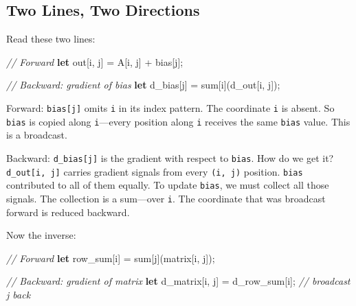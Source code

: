 \documentclass[11pt,titlepage]{article}
\newenvironment{Shaded}{}{}
\newcommand{\CommentTok}[1]{\textcolor[rgb]{0.38,0.63,0.69}{\textit{#1}}}
\newcommand{\KeywordTok}[1]{\textcolor[rgb]{0.00,0.44,0.13}{\textbf{#1}}}
\newcommand{\NormalTok}[1]{#1}
\newcommand{\OperatorTok}[1]{\textcolor[rgb]{0.40,0.40,0.40}{#1}}
\begin{document}
\vspace{2em}

\hypertarget{two-lines-two-directions}{%
\subsection{Two Lines, Two Directions}\label{two-lines-two-directions}}

Read these two lines:

\begin{Shaded}
\begin{Highlighting}[]
\CommentTok{// Forward}
\KeywordTok{let}\NormalTok{ out}\OperatorTok{[}\NormalTok{i, j}\OperatorTok{]}\NormalTok{ = A}\OperatorTok{[}\NormalTok{i, j}\OperatorTok{]}\NormalTok{ + bias}\OperatorTok{[}\NormalTok{j}\OperatorTok{]}\NormalTok{;}

\CommentTok{// Backward: gradient of bias}
\KeywordTok{let}\NormalTok{ d_bias}\OperatorTok{[}\NormalTok{j}\OperatorTok{]}\NormalTok{ = sum}\OperatorTok{[}\NormalTok{i}\OperatorTok{]}\NormalTok{(d_out}\OperatorTok{[}\NormalTok{i, j}\OperatorTok{]}\NormalTok{);}
\end{Highlighting}
\end{Shaded}

Forward: \texttt{bias{[}j{]}} omits \texttt{i} in its index pattern. The
coordinate \texttt{i} is absent. So \texttt{bias} is copied along
\texttt{i}---every position along \texttt{i} receives the same
\texttt{bias} value. This is a broadcast.

Backward: \texttt{d\_bias{[}j{]}} is the gradient with respect to
\texttt{bias}. How do we get it? \texttt{d\_out{[}i,\ j{]}} carries
gradient signals from every \texttt{(i,\ j)} position. \texttt{bias}
contributed to all of them equally. To update \texttt{bias}, we must
collect all those signals. The collection is a sum---over \texttt{i}.
The coordinate that was broadcast forward is reduced backward.

Now the inverse:

\begin{Shaded}
\begin{Highlighting}[]
\CommentTok{// Forward}
\KeywordTok{let}\NormalTok{ row_sum}\OperatorTok{[}\NormalTok{i}\OperatorTok{]}\NormalTok{ = sum}\OperatorTok{[}\NormalTok{j}\OperatorTok{]}\NormalTok{(matrix}\OperatorTok{[}\NormalTok{i, j}\OperatorTok{]}\NormalTok{);}

\CommentTok{// Backward: gradient of matrix}
\KeywordTok{let}\NormalTok{ d_matrix}\OperatorTok{[}\NormalTok{i, j}\OperatorTok{]}\NormalTok{ = d_row_sum}\OperatorTok{[}\NormalTok{i}\OperatorTok{]}\NormalTok{;  }\CommentTok{// broadcast j back}
\end{Highlighting}
\end{Shaded}
\end{document}
